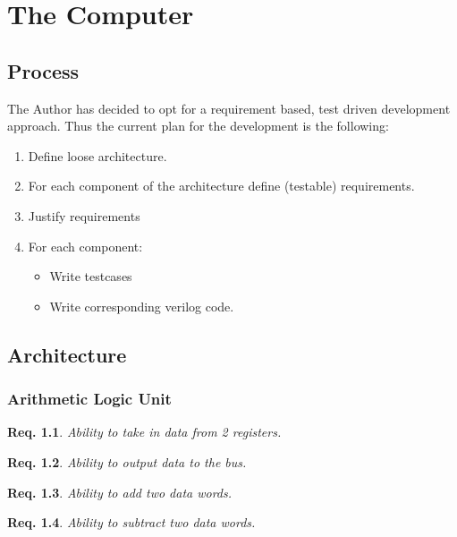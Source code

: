 \chapter{The Computer} %
\label{chap:The Computer}

\section{Process}

The Author has decided to opt for a requirement based, test driven development approach. Thus the current plan for the development is the following:
\begin{enumerate}
  \item Define loose architecture. 
  \item For each component of the architecture define (testable) requirements. 
  \item Justify requirements
  \item For each component:
  \begin{itemize}
    \item Write testcases
    \item Write corresponding verilog code.
  \end{itemize}
\end{enumerate}

\section{Architecture}
\newtheorem{requirement}{Req.}[subsection]

\subsection{Arithmetic Logic Unit}


\begin{requirement}
  Ability to take in data from 2 registers.
\end{requirement}

\begin{requirement}
  Ability to output data to the bus. 
\end{requirement}

\begin{requirement}
  Ability to add two data words.
\end{requirement}

\begin{requirement}
  Ability to subtract two data words.
\end{requirement}

